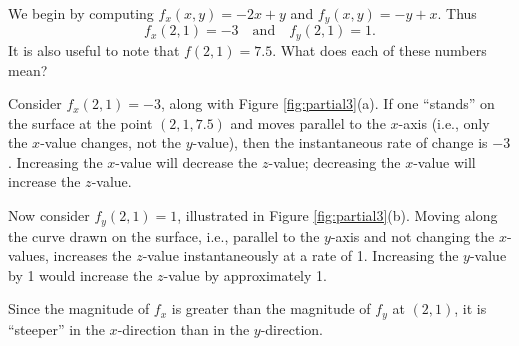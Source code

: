 {We begin by computing $f_x(x,y) = -2x+y$ and $f_y(x,y) = -y+x$. Thus
$$f_x(2,1) = -3 \quad \text{and}\quad f_y(2,1) = 1.$$
It is also useful to note that $f(2,1) = 7.5$. What does each of these numbers mean?

Consider $f_x(2,1)=-3$, along with Figure \ref{fig:partial3}(a). If one ``stands'' on the surface at the point $(2,1,7.5)$ and moves parallel to the $x$-axis (i.e., only the $x$-value changes, not the $y$-value), then the instantaneous rate of change is $-3$. Increasing the $x$-value will decrease the $z$-value; decreasing the $x$-value will increase the $z$-value.


Now consider $f_y(2,1)=1$, illustrated in Figure \ref{fig:partial3}(b). Moving along the curve drawn on the surface, i.e., parallel to the $y$-axis and not changing the $x$-values, increases the $z$-value instantaneously at a rate of 1. Increasing the $y$-value by 1 would increase the $z$-value by approximately 1.

Since the magnitude of $f_x$ is greater than the magnitude of $f_y$ at $(2,1)$, it is ``steeper'' in the $x$-direction than in the $y$-direction.
}\\

